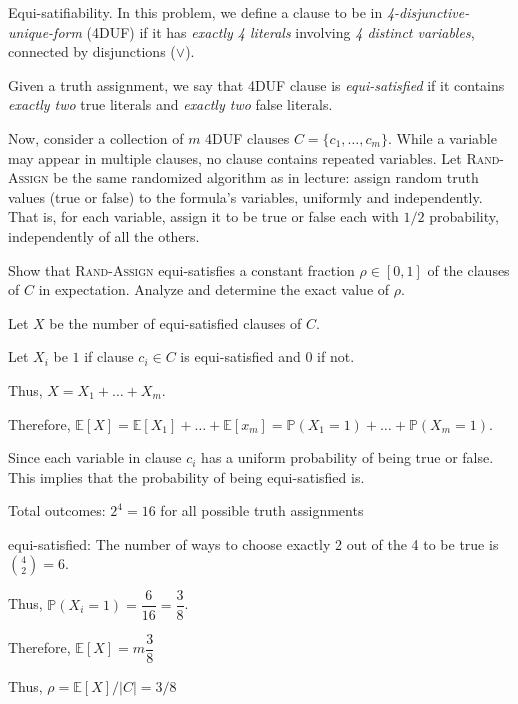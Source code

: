 \documentclass[12pt, letterpaper]{article}
\renewcommand{\P}{\mathbb{P}}
\begin{document}
\begin{problem}{Equi-satifiability.}
  In this problem, we define a clause to be in \emph{4-disjunctive-unique-form} (4DUF) if it has \emph{exactly 4 literals} involving \emph{4 distinct variables}, connected by disjunctions ($\lor$).

  Given a truth assignment, we say that 4DUF clause is \emph{equi-satisfied} if it contains \emph{exactly two} true literals and \emph{exactly two} false literals. 

  Now, consider a collection of $m$ 4DUF clauses $C = \{c_1, \ldots, c_m\}$. While a variable may appear in multiple clauses, no clause contains repeated variables. Let \textsc{Rand-Assign} be the same randomized algorithm as in lecture: assign random truth values (true or false) to the formula’s variables, uniformly and independently. That is, for each variable, assign it to be true or false each with $1/2$ probability, independently of all the others.
\end{problem}
\newcommand{\E}{\mathbb{E}}
\begin{subproblem}{}
  Show that \textsc{Rand-Assign} equi-satisfies a constant fraction $\rho \in [0,1]$ of the clauses of $C$ in expectation. Analyze and determine the exact value of $\rho$. 
\end{subproblem}
\begin{problemproof}
  Let $X$ be the number of equi-satisfied clauses of $C$.

  Let $X_i$ be $1$ if clause $c_i \in C$ is equi-satisfied and $0$ if not.

  Thus, $X=X_1+\dots+X_m$.

  Therefore, $\E[X]=\E[X_1]+\dots+\E[x_m]=\P(X_1=1)+\dots+\P(X_m=1)$.

  Since each variable in clause $c_i$ has a uniform probability of being true or false. This implies that the probability of being equi-satisfied is.

  Total outcomes: $2^4=16$ for all possible truth assignments

  equi-satisfied: The number of ways to choose exactly 2 out of the 4 to be true is $\binom{4}{2}=6$.

  Thus, $\P(X_i=1)=\dfrac{6}{16}=\dfrac{3}{8}$.

  Therefore, $\E[X]=m\dfrac{3}{8}$

  Thus, $\rho=\E[X]/|C|=3/8$
\end{problemproof}
\end{document}
